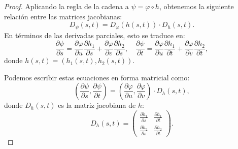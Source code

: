 \begin{proof}
    Aplicando la regla de la cadena a \(\psi = \varphi \circ h\), obtenemos la siguiente relación entre las matrices jacobianas:
    \[
        D_\psi(s,t) = D_\varphi(h(s,t)) \cdot D_h(s,t).
    \]
    En términos de las derivadas parciales, esto se traduce en:
    \[
        \frac{\partial \psi}{\partial s} = \frac{\partial \varphi}{\partial u} \frac{\partial h_1}{\partial s} + \frac{\partial \varphi}{\partial v} \frac{\partial h_2}{\partial s}, \quad \frac{\partial \psi}{\partial t} = \frac{\partial \varphi}{\partial u} \frac{\partial h_1}{\partial t} + \frac{\partial \varphi}{\partial v} \frac{\partial h_2}{\partial t},
    \]
    donde \(h(s,t) = (h_1(s,t), h_2(s,t))\).

    Podemos escribir estas ecuaciones en forma matricial como:
    \[
        \left( \frac{\partial \psi}{\partial s}, \frac{\partial \psi}{\partial t} \right) = \left( \frac{\partial \varphi}{\partial u}, \frac{\partial \varphi}{\partial v} \right) \cdot D_h(s,t),
    \]
    donde \(D_h(s,t)\) es la matriz jacobiana de \(h\):
    \[
        D_h(s,t) = \begin{pmatrix}
            \frac{\partial h_1}{\partial s} & \frac{\partial h_1}{\partial t} \\
            \frac{\partial h_2}{\partial s} & \frac{\partial h_2}{\partial t}
        \end{pmatrix}.
    \]


\end{proof}
